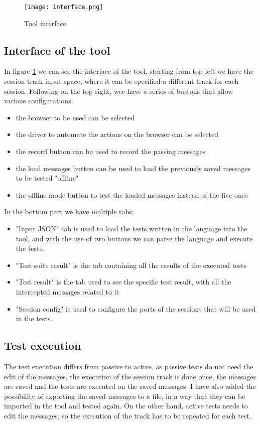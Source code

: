 \begin{figure}
    \texttt{[image: interface.png]}
    \caption{Tool interface}
    \label{fig:plugin_interface}
\end{figure}

\subsection{Interface of the tool}
In figure \ref{fig:plugin_interface} we can see the interface of the tool, starting from top left we have the session track input space, where it can be specified a different track for each session. Following on the top right, wee have a series of buttons that allow various configurations:
\begin{itemize}
    \item the browser to be used can be selected
    \item the driver to automate the actions on the browser can be selected
    \item the record button can be used to record the passing messages
    \item the load messages button can be used to load the previously saved messages to be tested "offline"
    \item the offline mode button to test the loaded messages instead of the live ones
\end{itemize}

In the bottom part we have multiple tabs:
\begin{itemize}
    \item "Input JSON" tab is used to load the tests written in the language into the tool, and with the use of two buttons we can parse the language and execute the tests.
    \item "Test suite result" is the tab containing all the results of the executed tests
    \item "Test result" is the tab used to see the specific test result, with all the intercepted messages related to it
    \item "Session config" is used to configure the ports of the sessions that will be used in the tests.
\end{itemize}

\subsection{Test execution}
The test execution differs from passive to active, as passive tests do not need the edit of the messages, the execution of the \gls{session track} is done once, the messages are saved and the tests are executed on the saved messages. I have also added the possibility of exporting the saved messages to a file, in a way that they can be imported in the tool and tested again.
On the other hand, active tests needs to edit the messages, so the execution of the track has to be repeated for each test.

